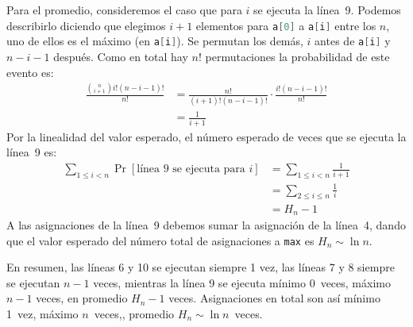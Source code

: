   Para el promedio,
  consideremos el caso que para \(i\) se ejecuta la línea~9.
  Podemos describirlo diciendo que elegimos \(i + 1\) elementos para
  \lstinline[language = C]!a[0]! a \lstinline[language = C]!a[i]!
  entre los \(n\),
  uno de ellos es el máximo
  (en \lstinline[language = C]!a[i]!).
  Se permutan los demás,
  \(i\) antes de \lstinline[language = C]!a[i]!
  y \(n - i - 1\) después.
  Como en total hay \(n!\) permutaciones
  la probabilidad de este evento es:
  \begin{align*}
    \frac{\binom{n}{i + 1} i! (n - i - 1)!}{n!}
      &= \frac{n!}{(i + 1)! (n - i - 1)!} \cdot \frac{i! (n - i - 1)!}{n!} \\
      &= \frac{1}{i + 1}
  \end{align*}
  Por la linealidad del valor esperado,
  el número esperado de veces que se ejecuta la línea~9 es:
  \begin{align*}
    \sum_{1 \le i < n} \Pr[\text{línea 9 se ejecuta para \(i\)}]
      &= \sum_{1 \le i < n} \frac{1}{i + 1} \\
      &= \sum_{2 \le i \le n} \frac{1}{i} \\
      &= H_n - 1
  \end{align*}
  A las asignaciones de la línea~9
  debemos sumar la asignación de la línea~4,
  dando que el valor esperado del número total
  de asignaciones a \lstinline[language = C]!max!
  es \(H_n \sim \ln n\).

  En resumen,
  las líneas 6 y 10 se ejecutan siempre \num{1} vez,
  las líneas 7 y 8 siempre se ejecutan \(n - 1\) veces,
  mientras la línea 9 se ejecuta
  mínimo \num{0}~veces,
  máximo~\(n - 1\) veces,
  en promedio \(H_n - 1\) veces.
  Asignaciones en total son así
  mínimo \num{1}~vez,
  máximo \(n\)~veces,,
  promedio \(H_n \sim \ln n\)~veces.




